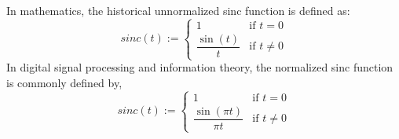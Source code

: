 \begin{enumerate}
    In mathematics, the historical unnormalized sinc function is defined as:
        \[sinc(t) := \begin{cases}
            1&\text{if } t = 0\\
            \dfrac{\sin(t)}{t}&\text{if } t \neq 0
        \end{cases}\]
        In digital signal processing and information theory, the normalized sinc function is commonly defined by,
        \[sinc(t) := \begin{cases}
            1&\text{if } t = 0\\
            \dfrac{\sin(\pi t)}{\pi t}&\text{if } t \neq 0
        \end{cases}\]

\end{enumerate}